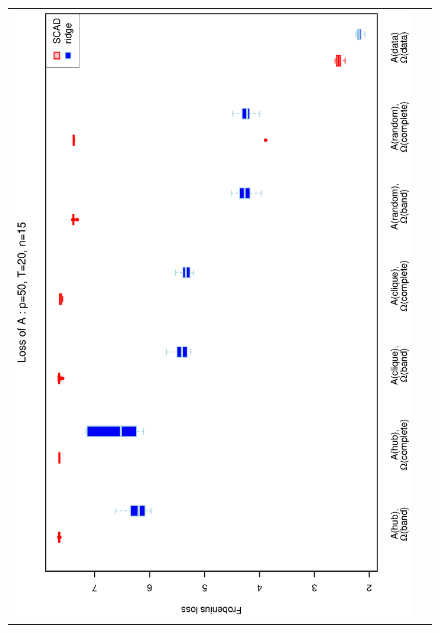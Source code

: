 \begin{figure}[h!]
\centering
\begin{tabular}{cc}
\includegraphics[scale=0.45,angle=270]{LossA50T20N15_25.eps}
\\

\end{tabular}
\end{figure}
